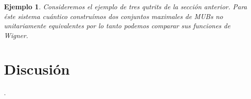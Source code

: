 \documentclass[a4paper]{report}
\newtheorem{example}{Ejemplo}
\begin{document}
  \begin{example}
    Consideremos el ejemplo de tres qutrits de la sección
    anterior. Para éste sistema cuántico construímos dos
    conjuntos maximales de MUBs no unitariamente
    equivalentes por lo tanto podemos comparar sus funciones
    de Wigner.
  \end{example}

  \clearpage
  \section{Discusión}

  .
  

  \newpage
  \appendix

  \newpage
  \printbibliography
\end{document}
